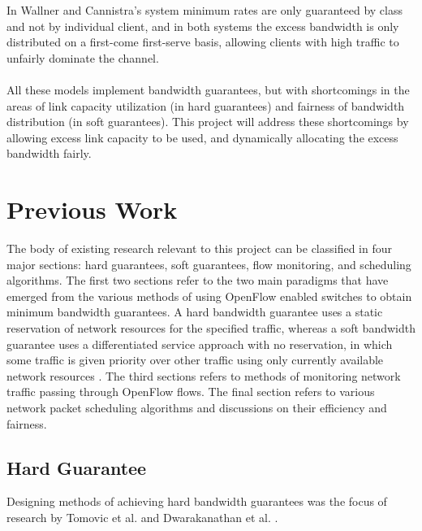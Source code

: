 \documentclass[accepted,single]{gipaper}
\begin{document}
In Wallner and Cannistra's \cite{Wallner:2013} system minimum rates are only guaranteed by class and not by individual client, and in both systems the excess bandwidth is only distributed on a first-come first-serve basis, allowing clients with high traffic to unfairly dominate the channel.
\\\\
All these models implement bandwidth guarantees, but with shortcomings in the areas of link capacity utilization (in hard guarantees) and fairness of bandwidth distribution (in soft guarantees). This project will address these shortcomings by allowing excess link capacity to be used, and dynamically allocating the excess bandwidth fairly.
\fi


\section{Previous Work}
\label{prev_work}

The body of existing research relevant to this project can be classified in four major sections: hard guarantees, soft guarantees, flow monitoring, and scheduling algorithms. The first two sections refer to the two main paradigms that have emerged from the various methods of using OpenFlow enabled switches to obtain minimum bandwidth guarantees. A hard bandwidth guarantee uses a static reservation of network resources for the specified traffic, whereas a soft bandwidth guarantee uses a differentiated service approach with no reservation, in which some traffic is given priority over other traffic using only currently available network resources \cite{softqos}. The third sections refers to methods of monitoring network traffic passing through OpenFlow flows. The final section refers to various network packet scheduling algorithms and discussions on their efficiency and fairness.

\subsection{Hard Guarantee}
\label{hard_qos}

Designing methods of achieving hard bandwidth guarantees was the focus of research by Tomovic et al. \cite{Tomovic:2014} and Dwarakanathan et al. \cite{Dwara:2015}.
\\
\end{document}

